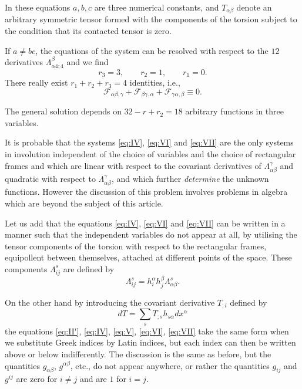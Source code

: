 \documentclass[leqno,11pt]{article}
\theoremstyle{shape1}
\theoremstyle{shape0}
\theoremstyle{shape2}
\theoremstyle{definition}
\begin{document}
In these equations $a,b,c$ are three numerical constants, and $T_{\alpha\beta}$ denote an arbitrary symmetric tensor formed with the components of the torsion subject to the condition that its contacted tensor is zero.

If $a\neq bc$, the equations of the system can be resolved with respect to the $12$ derivatives $\Lambda^{\beta}_{\alpha4;4}$ and we find
\[
r_{3}=3,\qquad r_{2}=1,\qquad r_{1}=0.
\]
There really exist $r_{1}+r_{2}+r_{3}=4$ identities, i.e.,
\[
\mathcal{F}_{\alpha\beta,\gamma}+\mathcal{F}_{\beta\gamma,\alpha}+\mathcal{F}_{\gamma\alpha,\beta}\equiv 0.
\]

The general solution depends on $32-r+r_{2}=18$ arbitrary functions in three variables.

It is probable that the systems \eqref{eq:IV}, \eqref{eq:VI} and \eqref{eq:VII} are the only systems in involution independent of the choice of variables and the choice of rectangular frames and which are linear with respect to the covariant derivatives of $\Lambda^{\gamma}_{\alpha\beta}$ and quadratic with respect to $\Lambda^{\gamma}_{\alpha\beta}$, and which further \emph{determine} the unknown functions. However the discussion of this problem involves problems in algebra which are beyond the subject of this article.

Let us add that the equations \eqref{eq:IV}, \eqref{eq:VI} and \eqref{eq:VII} can be written in a manner such that the independent variables do not appear at all, by utilising the tensor components of the torsion with respect to the rectangular frames, equipollent between themselves, attached at different points of the space. These components $\Lambda^{s}_{ij}$ are defined by
\[
\Lambda^{s}_{ij}=h^{\alpha}_{i}h^{\beta}_{j}\Lambda^{s}_{\alpha\beta}.
\]

On the other hand by introducing the covariant derivative $T_{;i}$ defined by
\[
dT=\sum_{s}T_{;s}h_{s\alpha}dx^{\alpha}
\]
the equations \eqref{eq:II'}, \eqref{eq:IV}, \eqref{eq:V}, \eqref{eq:VI}, \eqref{eq:VII} take the same form when we substitute Greek indices by Latin indices, but each index can then be written above or below indifferently. The discussion is the same as before, but the quantities $g_{\alpha\beta}$, $g^{\alpha\beta}$, etc., do not appear anywhere, or rather the quantities $g_{ij}$ and $g^{ij}$ are zero for $i\neq j$ and are $1$ for $i=j$.
\end{document}

